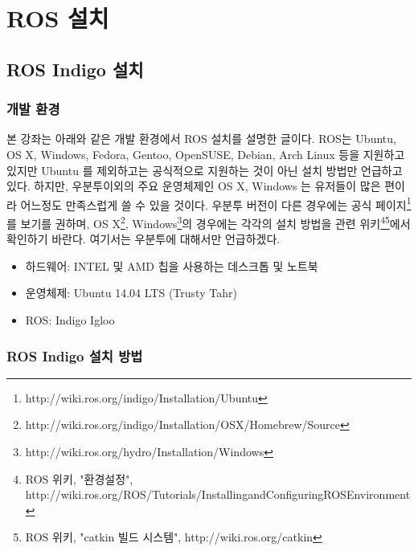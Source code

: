 
\chapter{ROS 설치}

\section{ROS Indigo 설치}

\subsection{개발 환경}

본 강좌는 아래와 같은 개발 환경에서 ROS 설치를 설명한 글이다. ROS는 Ubuntu, OS X, Windows, Fedora, Gentoo, OpenSUSE, Debian, Arch Linux 등을 지원하고 있지만 Ubuntu 를 제외하고는 공식적으로 지원하는 것이 아닌 설치 방법만 언급하고 있다. 하지만, 우분투이외의 주요 운영체제인 OS X, Windows 는 유저들이 많은 편이라 어느정도 만족스럽게 쓸 수 있을 것이다. 우분투 버전이 다른 경우에는 공식 페이지\footnote{http://wiki.ros.org/indigo/Installation/Ubuntu}를 보기를 권하며, OS X\footnote{http://wiki.ros.org/indigo/Installation/OSX/Homebrew/Source}, Windows\footnote{http://wiki.ros.org/hydro/Installation/Windows}의 경우에는 각각의 설치 방법을 관련 위키\footnote{ROS 위키, "환경설정", http://wiki.ros.org/ROS/Tutorials/InstallingandConfiguringROSEnvironment}\footnote{ROS 위키, "catkin 빌드 시스템", http://wiki.ros.org/catkin}에서 확인하기 바란다. 여기서는 우분투에 대해서만 언급하겠다.

\begin{itemize}
\item 하드웨어: INTEL 및 AMD 칩을 사용하는 데스크톱 및 노트북 
\item 운영체제: Ubuntu 14.04 LTS (Trusty Tahr)
\item ROS: Indigo Igloo
\end{itemize}

\subsection{ROS Indigo 설치 방법}
\label{sec:ROSInstallation}


